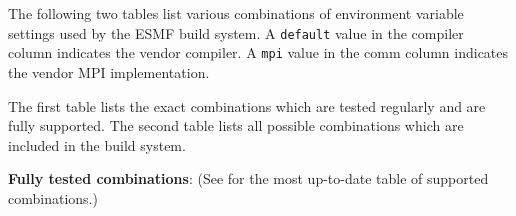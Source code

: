 

The following two tables list various combinations of environment 
variable settings used by the ESMF build system. A {\tt default}
value in the compiler column indicates the vendor compiler. A {\tt mpi}
value in the comm column indicates the vendor MPI implementation.

The first table lists the exact combinations which are tested regularly and are
fully supported. The second table lists all possible combinations which are 
included in the build system.

\vspace{1ex}
{\bf Fully tested combinations}: (See  for the most up-to-date table of supported combinations.)
\vspace{1ex}

